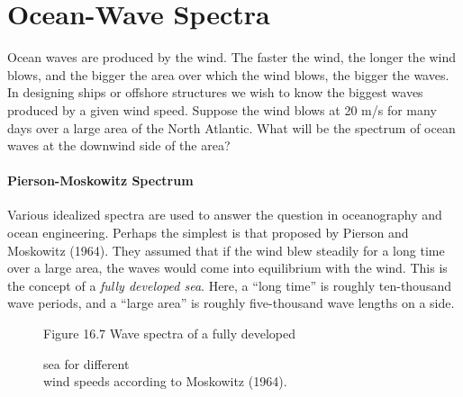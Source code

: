 \section{Ocean-Wave Spectra}
Ocean waves are produced by the wind. The faster
the wind, the longer the wind blows, and the bigger the area over
which the wind blows, the bigger the waves. In designing ships or
offshore structures we wish to know the biggest waves produced by a
given wind speed. Suppose the wind blows at 20 m/s for many days over
a large area of the North Atlantic. What will be the spectrum of ocean
waves at the downwind side of the area?

\paragraph{Pierson-Moskowitz Spectrum}
Various idealized spectra are
used to answer the question in ocean\-ography and ocean
engineering. Perhaps the simplest is that proposed by Pierson and
Moskowitz (1964). They assumed that if the wind blew steadily for a
long time over a large area, the waves would come into equilibrium
with the wind. This is the concept of a \textit{fully developed
  sea}. Here, a ``long time'' is
roughly ten-thousand wave periods, and a ``large area'' is roughly
five-thousand wave lengths on a side.

\begin{figure}[t!]
\footnotesize
\centering
Figure 16.7 Wave spectra of a fully developed \rule{0mm}{4ex}sea for
different\\wind speeds according to Moskowitz (1964).

\label{fig:PMSpectra}
\vspace{-2ex}
\end{figure}

